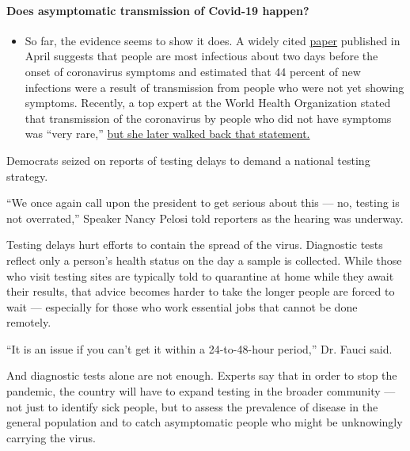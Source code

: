 \begin{itemize}
{  \paragraph{Does asymptomatic transmission of Covid-19
  happen?}\label{does-asymptomatic-transmission-of-covid-19-happen}}

  \begin{itemize}
  \tightlist
  \item
    So far, the evidence seems to show it does. A widely cited
    \href{https://www.nature.com/articles/s41591-020-0869-5}{paper}
    published in April suggests that people are most infectious about
    two days before the onset of coronavirus symptoms and estimated that
    44 percent of new infections were a result of transmission from
    people who were not yet showing symptoms. Recently, a top expert at
    the World Health Organization stated that transmission of the
    coronavirus by people who did not have symptoms was ``very rare,''
    \href{https://www.nytimes.com/2020/06/09/world/coronavirus-updates.html?action=click\&pgtype=Article\&state=default\&region=MAIN_CONTENT_3\&context=storylines_faq\#link-1f302e21}{but
    she later walked back that statement.}
  \end{itemize}
\end{itemize}

Democrats seized on reports of testing delays to demand a national
testing strategy.

``We once again call upon the president to get serious about this ---
no, testing is not overrated,'' Speaker Nancy Pelosi told reporters as
the hearing was underway.

Testing delays hurt efforts to contain the spread of the virus.
Diagnostic tests reflect only a person's health status on the day a
sample is collected. While those who visit testing sites are typically
told to quarantine at home while they await their results, that advice
becomes harder to take the longer people are forced to wait ---
especially for those who work essential jobs that cannot be done
remotely.

``It is an issue if you can't get it within a 24-to-48-hour period,''
Dr. Fauci said.

And diagnostic tests alone are not enough. Experts say that in order to
stop the pandemic, the country will have to expand testing in the
broader community --- not just to identify sick people, but to assess
the prevalence of disease in the general population and to catch
asymptomatic people who might be unknowingly carrying the virus.

